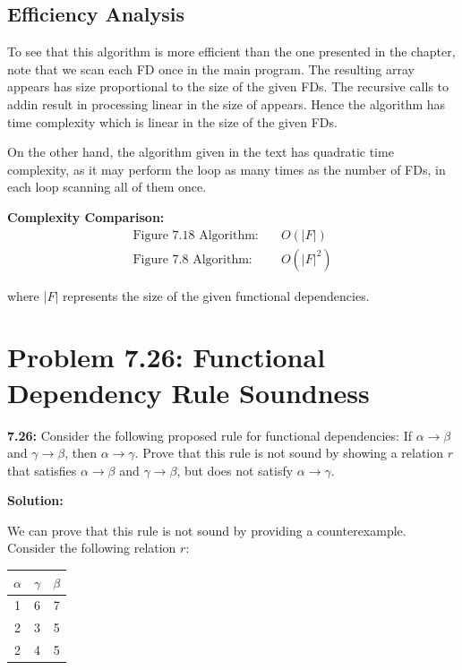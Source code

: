 \documentclass[12pt,a4paper]{article}
\begin{document}
\subsection{Efficiency Analysis}

To see that this algorithm is more efficient than the one presented in the chapter, note that we scan each FD once in the main program. The resulting array appears has size proportional to the size of the given FDs. The recursive calls to addin result in processing linear in the size of appears. Hence the algorithm has time complexity which is linear in the size of the given FDs.

On the other hand, the algorithm given in the text has quadratic time complexity, as it may perform the loop as many times as the number of FDs, in each loop scanning all of them once.

\textbf{Complexity Comparison:}
\begin{align}
\text{Figure 7.18 Algorithm:} &\quad O(|F|) \\
\text{Figure 7.8 Algorithm:} &\quad O(|F|^2)
\end{align}

where $|F|$ represents the size of the given functional dependencies.

\section{Problem 7.26: Functional Dependency Rule Soundness}

\begin{questionbox}
\textbf{7.26:} Consider the following proposed rule for functional dependencies: If $\alpha \rightarrow \beta$ and $\gamma \rightarrow \beta$, then $\alpha \rightarrow \gamma$. Prove that this rule is not sound by showing a relation $r$ that satisfies $\alpha \rightarrow \beta$ and $\gamma \rightarrow \beta$, but does not satisfy $\alpha \rightarrow \gamma$.
\end{questionbox}

\textbf{Solution:}

We can prove that this rule is not sound by providing a counterexample. Consider the following relation $r$:

\begin{center}
\begin{tabular}{|c|c|c|}
\hline
$\alpha$ & $\gamma$ & $\beta$ \\
\hline
1 & 6 & 7 \\
2 & 3 & 5 \\
2 & 4 & 5 \\
\hline
\end{tabular}
\end{center}
\end{document}
